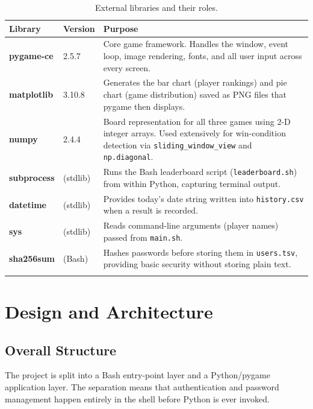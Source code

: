 \documentclass[12pt,a4paper]{article}
\begin{document}
\begin{longtable}{>{\bfseries}p{3.2cm} p{2.2cm} p{8cm}}
  \toprule
  Library & Version & Purpose \\
  \midrule
  \endhead
  
  pygame-ce & 2.5.7 & Core game framework. Handles the window, event loop, image
                 rendering, fonts, and all user input across every screen. \\[4pt]
  matplotlib & 3.10.8 & Generates the bar chart (player rankings) and pie chart
                      (game distribution) saved as PNG files that pygame then
                      displays. \\[4pt]
  numpy & 2.4.4 & Board representation for all three games using 2-D integer
                arrays. Used extensively for win-condition detection via
                \texttt{sliding\_window\_view} and \texttt{np.diagonal}. \\[4pt]
  
  subprocess & (stdlib) & Runs the Bash leaderboard script
                           (\texttt{leaderboard.sh}) from within Python,
                           capturing terminal output. \\[4pt]
  datetime & (stdlib) & Provides today's date string written into
                         \texttt{history.csv} when a result is recorded. \\[4pt]
  sys & (stdlib) & Reads command-line arguments (player names) passed from
                    \texttt{main.sh}. \\[4pt]
  sha256sum & (Bash) & Hashes passwords before storing them in
                        \texttt{users.tsv}, providing basic security without
                        storing plain text. \\
  \bottomrule
  \caption{External libraries and their roles.}
\end{longtable}
 

\section{Design and Architecture}

 
\subsection{Overall Structure}
 
The project is split into a Bash entry-point layer and a Python/pygame
application layer. The separation means that authentication and password
management happen entirely in the shell before Python is ever invoked.
 
\end{document}
